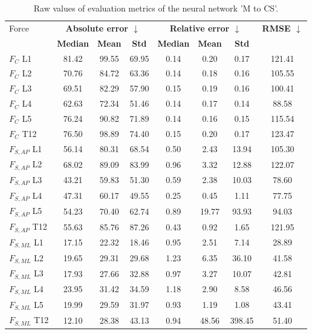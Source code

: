 \begin{table}[h]
\centering
\caption{Raw values of evaluation metrics of the neural network 'M to CS'.}
\label{tab:prelim:m_to_cs.tex}
\begin{tabular}{lccccccc}
\toprule
Force & \multicolumn{3}{c}{\bfseries Absolute error $\downarrow$} & \multicolumn{3}{c}{\bfseries Relative error $\downarrow$} & \bfseries RMSE $\downarrow$ \\
  & \bfseries Median & \bfseries Mean & \bfseries Std & \bfseries Median & \bfseries Mean & \bfseries Std & \bfseries   \\
\midrule
$F_{C}$ L1 & 81.42 & 99.55 & 69.95 & 0.14 & 0.20 & 0.17 & 121.41 \\
$F_{C}$ L2 & 70.76 & 84.72 & 63.36 & 0.14 & 0.18 & 0.16 & 105.55 \\
$F_{C}$ L3 & 69.51 & 82.29 & 57.90 & 0.15 & 0.19 & 0.16 & 100.41 \\
$F_{C}$ L4 & 62.63 & 72.34 & 51.46 & 0.14 & 0.17 & 0.14 & 88.58 \\
$F_{C}$ L5 & 76.24 & 90.82 & 71.89 & 0.14 & 0.16 & 0.15 & 115.54 \\
$F_{C}$ T12 & 76.50 & 98.89 & 74.40 & 0.15 & 0.20 & 0.17 & 123.47 \\
$F_{S,AP}$ L1 & 56.14 & 80.31 & 68.54 & 0.50 & 2.43 & 13.94 & 105.30 \\
$F_{S,AP}$ L2 & 68.02 & 89.09 & 83.99 & 0.96 & 3.32 & 12.88 & 122.07 \\
$F_{S,AP}$ L3 & 43.21 & 59.83 & 51.30 & 0.59 & 2.38 & 10.03 & 78.60 \\
$F_{S,AP}$ L4 & 47.31 & 60.17 & 49.55 & 0.25 & 0.45 & 1.11 & 77.75 \\
$F_{S,AP}$ L5 & 54.23 & 70.40 & 62.74 & 0.89 & 19.77 & 93.93 & 94.03 \\
$F_{S,AP}$ T12 & 55.63 & 85.76 & 87.26 & 0.43 & 0.92 & 1.65 & 121.95 \\
$F_{S,ML}$ L1 & 17.15 & 22.32 & 18.46 & 0.95 & 2.51 & 7.14 & 28.89 \\
$F_{S,ML}$ L2 & 19.65 & 29.31 & 29.68 & 1.23 & 6.35 & 36.10 & 41.58 \\
$F_{S,ML}$ L3 & 17.93 & 27.66 & 32.88 & 0.97 & 3.27 & 10.07 & 42.81 \\
$F_{S,ML}$ L4 & 23.95 & 31.42 & 34.59 & 1.18 & 2.90 & 8.58 & 46.56 \\
$F_{S,ML}$ L5 & 19.99 & 29.59 & 31.97 & 0.93 & 1.19 & 1.08 & 43.41 \\
$F_{S,ML}$ T12 & 12.10 & 28.38 & 43.13 & 0.94 & 48.56 & 398.45 & 51.40 \\
\bottomrule
\end{tabular}
\end{table}
